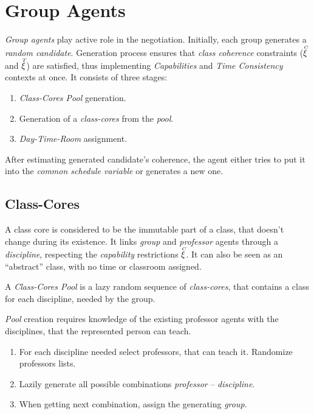 \documentclass[../../ThesisDoc]{subfiles}
\begin{document}
\providecommand{\rootdir}{../..}


\section{Group Agents}

\emph{Group agents} play active role in the negotiation.
Initially, each group generates a \emph{random candidate}.
Generation process ensures that \emph{class coherence} constraints
($\accentset{C}{\xi}$ and $\accentset{T}{\xi}$) are satisfied, thus implementing \textit{Capabilities}
and \textit{Time Consistency} contexts at once. It consists of three stages:
\begin{enumerate}
  \item \emph{Class-Cores Pool} generation.
  \item Generation of a \emph{class-cores} from the \emph{pool}.
  \item \emph{Day-Time-Room} assignment.
\end{enumerate}


\noindent
After estimating generated candidate's coherence, the agent either tries to put
it into the \emph{common schedule variable} or generates a new one.


\subsection{Class-Cores}
\label{sec:solution-CC}

A class core is considered to be the immutable part of a class, that doesn't
change during its existence. It links \emph{group} and \emph{professor} agents
through a \emph{discipline}, respecting the \emph{capability} restrictions $\accentset{C}{\xi}$.
It can also be seen as an ``abstract'' class, with no time or classroom assigned.

A \emph{Class-Cores Pool} is a lazy random sequence of \emph{class-cores},
that contains a class for each discipline, needed by the group.

\emph{Pool} creation requires knowledge of the existing professor agents with
the disciplines, that the represented person can teach.
\begin{enumerate}
  \item For each discipline needed select professors, that can teach it.
        Randomize professors lists.
  \item Lazily generate all possible combinations \emph{professor} -- \emph{discipline}.
  \item When getting next combination, assign the generating \emph{group}.
\end{enumerate}
\end{document}
